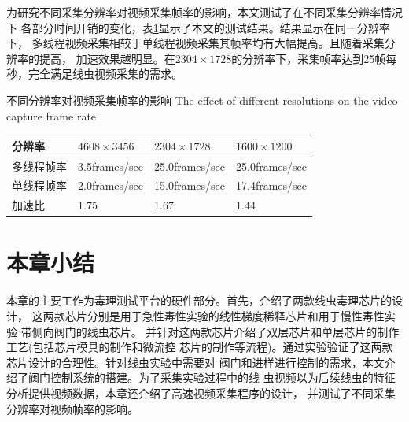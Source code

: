 	为研究不同采集分辨率对视频采集帧率的影响，本文测试了在不同采集分辨率情况下
	各部分时间开销的变化，表\ref{tab:resolutions}显示了本文的测试结果。结果显示在同一分辨率下，
	多线程视频采集相较于单线程视频采集其帧率均有大幅提高。且随着采集分辨率的提高，
	加速效果越明显。在$2304\times1728$的分辨率下，采集帧率达到25帧每秒，完全满足线虫视频采集的需求。
	\begin{table}[thbp]
	\centering
	\bicaption
    {不同分辨率对视频采集帧率的影响}
    {The effect of different resolutions on the video capture frame rate}
	\label{tab:resolutions}
	\begin{tabular}{p{80pt}p{80pt}p{80pt}p{80pt}}
	\toprule
	分辨率 & $4608\times3456$ & $2304\times1728$ & $1600\times1200$ \\
	\midrule
	多线程帧率 & 3.5frames/sec & 25.0frames/sec & 25.0frames/sec \\
	单线程帧率 & 2.0frames/sec  &15.0frames/sec &  17.4frames/sec \\
	加速比		&  1.75		  &   1.67        &  1.44 \\
	\bottomrule
	\end{tabular}
	\end{table}
\section{本章小结}
	本章的主要工作为毒理测试平台的硬件部分。首先，介绍了两款线虫毒理芯片的设计，
	这两款芯片分别是用于急性毒性实验的线性梯度稀释芯片和用于慢性毒性实验
	带侧向阀门的线虫芯片。
	并针对这两款芯片介绍了双层芯片和单层芯片的制作工艺(包括芯片模具的制作和微流控
	芯片的制作等流程)。通过实验验证了这两款芯片设计的合理性。针对线虫实验中需要对
	阀门和进样进行控制的需求，本文介绍了阀门控制系统的搭建。为了采集实验过程中的线
	虫视频以为后续线虫的特征分析提供视频数据，本章还介绍了高速视频采集程序的设计，
	并测试了不同采集分辨率对视频帧率的影响。 